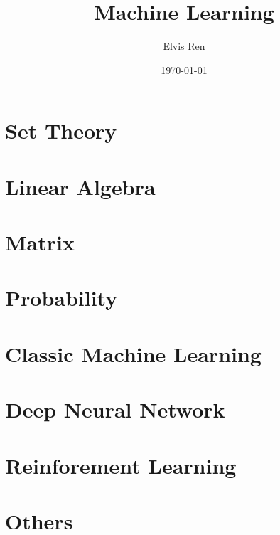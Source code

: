 \documentclass[reqno]{book}
\begin{document}
\title{Machine Learning}
\author{Elvis Ren}
\date{\today}

\maketitle
\tableofcontents



\chapter{Set Theory}





\chapter{Linear Algebra}










\chapter{Matrix}



\chapter{Probability}




\chapter{Classic Machine Learning}



\chapter {Deep Neural Network}


\chapter{Reinforement Learning}



 









\chapter{Others}




\printindex
\end{document}
